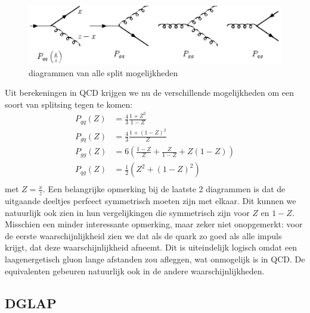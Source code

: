 \documentclass[../main.tex]{subfiles}
\begin{document}
\begin{figure}[h]
    \centering
    \includegraphics[width=0.8\linewidth]{QCD/split_func_all.png}
    \caption{diagrammen van alle split mogelijkheden}%
    \label{fig:split_func_all}
\end{figure}

Uit berekeningen in QCD krijgen we nu de verschillende mogelijkheden om een soort van splitsing tegen te komen:
\begin{equation}
    \begin{aligned}
        \label{eq:}
        P_{qq}(Z) &= \frac{4}{3} \frac{1+Z^2}{1-Z} \\
        P_{gq}(Z) &= \frac{4}{3} \frac{1+(1-Z)^2}{Z} \\
        P_{gg}(Z) &= 6 \left( \frac{1-Z}{Z} + \frac{Z}{1-Z} + Z(1-Z) \right) \\
        P_{qg}(Z) &= \frac{1}{2} \left( Z^2 + (1-Z)^2 \right) \\
    \end{aligned}
\end{equation}
met $Z= \frac{x}{z}$. Een belangrijke opmerking bij de laatste 2 diagrammen is dat de uitgaande deeltjes perfeect symmetrisch moeten zijn met elkaar. Dit kunnen we natuurlijk ook zien in hun vergelijkingen die symmetrisch zijn voor $Z$ en $1-Z$. Misschien een minder interessante opmerking, maar zeker niet onopgemerkt: voor de eerste waarschijnlijkheid zien we dat als de quark zo goed als alle impuls krijgt, dat deze waarschijnlijkheid afneemt. Dit is uiteindelijk logisch omdat een laagenergetisch gluon lange afstanden zou afleggen, wat onmogelijk is in QCD. De equivalenten gebeuren natuurlijk ook in de andere waarschijnlijkheden.

\subsection{DGLAP}%
\label{sub:dglap}
\end{document}
